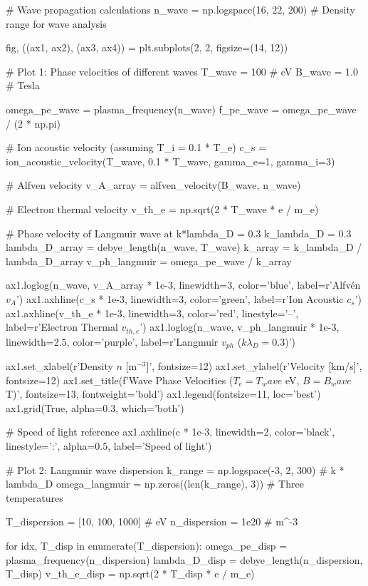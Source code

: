 \documentclass[11pt,a4paper]{article}
\begin{document}
\begin{pycode}
# Wave propagation calculations
n_wave = np.logspace(16, 22, 200)  # Density range for wave analysis

fig, ((ax1, ax2), (ax3, ax4)) = plt.subplots(2, 2, figsize=(14, 12))

# Plot 1: Phase velocities of different waves
T_wave = 100  # eV
B_wave = 1.0  # Tesla

omega_pe_wave = plasma_frequency(n_wave)
f_pe_wave = omega_pe_wave / (2 * np.pi)

# Ion acoustic velocity (assuming T_i = 0.1 * T_e)
c_s = ion_acoustic_velocity(T_wave, 0.1 * T_wave, gamma_e=1, gamma_i=3)

# Alfven velocity
v_A_array = alfven_velocity(B_wave, n_wave)

# Electron thermal velocity
v_th_e = np.sqrt(2 * T_wave * e / m_e)

# Phase velocity of Langmuir wave at k*lambda_D = 0.3
k_lambda_D = 0.3
lambda_D_array = debye_length(n_wave, T_wave)
k_array = k_lambda_D / lambda_D_array
v_ph_langmuir = omega_pe_wave / k_array

ax1.loglog(n_wave, v_A_array * 1e-3, linewidth=3, color='blue', label=r'Alfv\'en $v_A$')
ax1.axhline(c_s * 1e-3, linewidth=3, color='green', label=r'Ion Acoustic $c_s$')
ax1.axhline(v_th_e * 1e-3, linewidth=3, color='red', linestyle='--', label=r'Electron Thermal $v_{th,e}$')
ax1.loglog(n_wave, v_ph_langmuir * 1e-3, linewidth=2.5, color='purple',
          label=r'Langmuir $v_{ph}$ ($k\lambda_D = 0.3$)')

ax1.set_xlabel(r'Density $n$ [m$^{-3}$]', fontsize=12)
ax1.set_ylabel(r'Velocity [km/s]', fontsize=12)
ax1.set_title(f'Wave Phase Velocities ($T_e = {T_wave}$ eV, $B = {B_wave}$ T)',
             fontsize=13, fontweight='bold')
ax1.legend(fontsize=11, loc='best')
ax1.grid(True, alpha=0.3, which='both')

# Speed of light reference
ax1.axhline(c * 1e-3, linewidth=2, color='black', linestyle=':', alpha=0.5, label='Speed of light')

# Plot 2: Langmuir wave dispersion
k_range = np.logspace(-3, 2, 300)  # k * lambda_D
omega_langmuir = np.zeros((len(k_range), 3))  # Three temperatures

T_dispersion = [10, 100, 1000]  # eV
n_dispersion = 1e20  # m^-3

for idx, T_disp in enumerate(T_dispersion):
    omega_pe_disp = plasma_frequency(n_dispersion)
    lambda_D_disp = debye_length(n_dispersion, T_disp)
    v_th_e_disp = np.sqrt(2 * T_disp * e / m_e)


\end{pycode}
\end{document}
